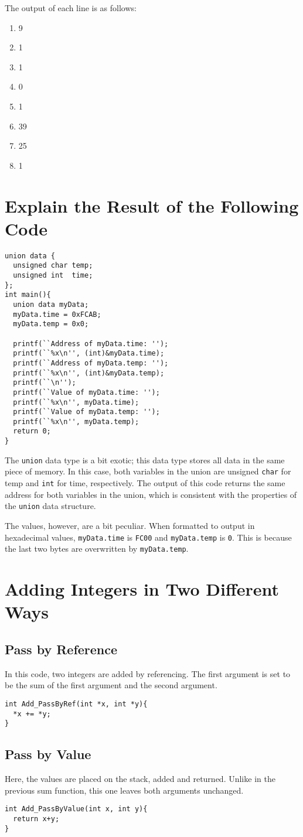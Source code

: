 \documentclass{hw}
\begin{document}
  The output of each line is as follows:

\begin{enumerate}
  \item 9
  \item 1
  \item 1
  \item 0
  \item 1
  \item 39
  \item 25
  \item 1
    
\end{enumerate}

\section{Explain the Result of the Following Code}
\begin{lstlisting}
union data {
  unsigned char temp;
  unsigned int  time;
};
int main(){
  union data myData;
  myData.time = 0xFCAB;
  myData.temp = 0x0;

  printf(``Address of myData.time: '');
  printf(``%x\n'', (int)&myData.time);
  printf(``Address of myData.temp: '');
  printf(``%x\n'', (int)&myData.temp);
  printf(``\n'');
  printf(``Value of myData.time: '');
  printf(``%x\n'', myData.time);
  printf(``Value of myData.temp: '');
  printf(``%x\n'', myData.temp);
  return 0;
}
\end{lstlisting}

The \texttt{union} data type is a bit exotic; this data type stores all
data in the same piece of memory. In this case, both variables in the union
are unsigned \texttt{char} for temp and \texttt{int} for time,
respectively. The output of this code returns the same address for both
variables in the union, which is consistent with the properties of the
\texttt{union} data structure.

The values, however, are a bit peculiar. When formatted to output in
hexadecimal values, \texttt{myData.time} is \texttt{FC00} and
\texttt{myData.temp} is \texttt{0}. This is because the last two bytes are
overwritten by \texttt{myData.temp}. 

\section{Adding Integers in Two Different Ways}
\subsection{Pass by Reference}
In this code, two integers are added by referencing. The first argument is
set to be the sum of the first argument and the second argument.
\begin{lstlisting}
int Add_PassByRef(int *x, int *y){
  *x += *y;
}
\end{lstlisting}

\subsection{Pass by Value}
Here, the values are placed on the stack, added and returned. Unlike in
the previous sum function, this one leaves both arguments unchanged.
\begin{lstlisting}
int Add_PassByValue(int x, int y){
  return x+y;
}
\end{lstlisting}
\end{document}
